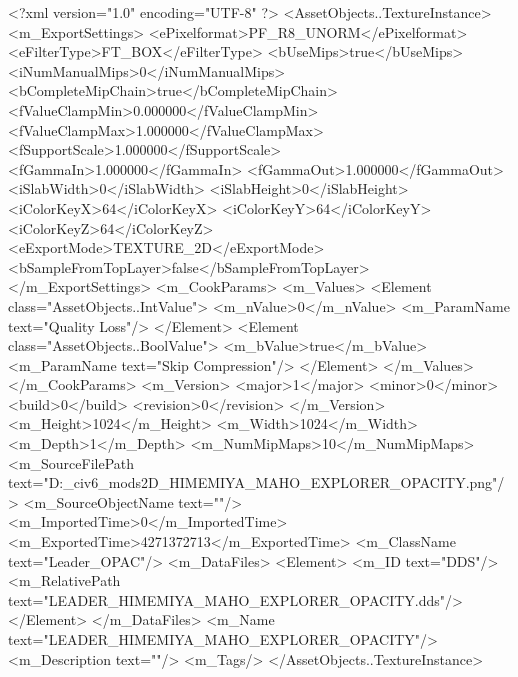 <?xml version="1.0" encoding="UTF-8" ?>
<AssetObjects..TextureInstance>
	<m_ExportSettings>
		<ePixelformat>PF_R8_UNORM</ePixelformat>
		<eFilterType>FT_BOX</eFilterType>
		<bUseMips>true</bUseMips>
		<iNumManualMips>0</iNumManualMips>
		<bCompleteMipChain>true</bCompleteMipChain>
		<fValueClampMin>0.000000</fValueClampMin>
		<fValueClampMax>1.000000</fValueClampMax>
		<fSupportScale>1.000000</fSupportScale>
		<fGammaIn>1.000000</fGammaIn>
		<fGammaOut>1.000000</fGammaOut>
		<iSlabWidth>0</iSlabWidth>
		<iSlabHeight>0</iSlabHeight>
		<iColorKeyX>64</iColorKeyX>
		<iColorKeyY>64</iColorKeyY>
		<iColorKeyZ>64</iColorKeyZ>
		<eExportMode>TEXTURE_2D</eExportMode>
		<bSampleFromTopLayer>false</bSampleFromTopLayer>
	</m_ExportSettings>
	<m_CookParams>
		<m_Values>
			<Element class="AssetObjects..IntValue">
				<m_nValue>0</m_nValue>
				<m_ParamName text="Quality Loss"/>
			</Element>
			<Element class="AssetObjects..BoolValue">
				<m_bValue>true</m_bValue>
				<m_ParamName text="Skip Compression"/>
			</Element>
		</m_Values>
	</m_CookParams>
	<m_Version>
		<major>1</major>
		<minor>0</minor>
		<build>0</build>
		<revision>0</revision>
	</m_Version>
	<m_Height>1024</m_Height>
	<m_Width>1024</m_Width>
	<m_Depth>1</m_Depth>
	<m_NumMipMaps>10</m_NumMipMaps>
	<m_SourceFilePath text="D:\Documents\GitHub\Uzuki_civ6_mods\LandsolPrinFes\Texture2D\LEADER_HIMEMIYA_MAHO_EXPLORER_OPACITY.png"/>
	<m_SourceObjectName text=""/>
	<m_ImportedTime>0</m_ImportedTime>
	<m_ExportedTime>4271372713</m_ExportedTime>
	<m_ClassName text="Leader_OPAC"/>
	<m_DataFiles>
		<Element>
			<m_ID text="DDS"/>
			<m_RelativePath text="LEADER_HIMEMIYA_MAHO_EXPLORER_OPACITY.dds"/>
		</Element>
	</m_DataFiles>
	<m_Name text="LEADER_HIMEMIYA_MAHO_EXPLORER_OPACITY"/>
	<m_Description text=""/>
	<m_Tags/>
</AssetObjects..TextureInstance>


